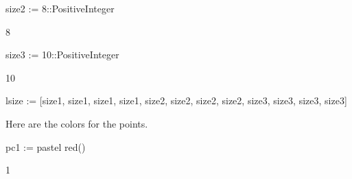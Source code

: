 \begin{xtc}
\begin{xtccomment}
\end{xtccomment}
\begin{spadsrc}
size2 := 8::PositiveInteger 
\end{spadsrc}
\begin{TeXOutput}
\begin{fricasmath}{15}
8%
\end{fricasmath}
\end{TeXOutput}
\end{xtc}
\begin{xtc}
\begin{xtccomment}
\end{xtccomment}
\begin{spadsrc}
size3 := 10::PositiveInteger 
\end{spadsrc}
\begin{TeXOutput}
\begin{fricasmath}{16}
10%
\end{fricasmath}
\end{TeXOutput}
\end{xtc}
\begin{xtc}
\begin{xtccomment}
\end{xtccomment}
\begin{spadsrc}
lsize := [size1, size1, size1, size1, size2, size2, size2, size2, size3, size3, size3, size3] 
\end{spadsrc}
\begin{TeXOutput}
\begin{fricasmath}{17}
%
\end{fricasmath}
\end{TeXOutput}
\end{xtc}
\begin{xtc}
\begin{xtccomment}
Here are the colors for the points.
\end{xtccomment}
\begin{spadsrc}
pc1 := pastel red() 
\end{spadsrc}
\begin{TeXOutput}
\begin{fricasmath}{18}
\STRING{[}1\STRING{%
]\ from\ the\ }%
\end{fricasmath}
\end{TeXOutput}
\end{xtc}
